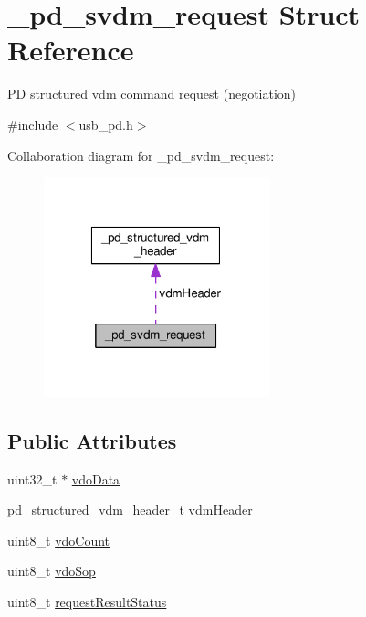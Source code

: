 \hypertarget{struct__pd__svdm__request}{\section{\-\_\-pd\-\_\-svdm\-\_\-request Struct Reference}
\label{struct__pd__svdm__request}
}


P\-D structured vdm command request (negotiation)  




{\ttfamily \#include $<$usb\-\_\-pd.\-h$>$}



Collaboration diagram for \-\_\-pd\-\_\-svdm\-\_\-request\-:
\nopagebreak
\begin{figure}[H]
\begin{center}
\leavevmode
\includegraphics[width=186pt]{struct__pd__svdm__request__coll__graph}
\end{center}
\end{figure}
\subsection*{Public Attributes}
\begin{DoxyCompactItemize}
\item 
uint32\-\_\-t $\ast$ \hyperlink{struct__pd__svdm__request_ac674930499f5462b363cb7890746888e}{vdo\-Data}
\item 
\hyperlink{group__usb__pd__stack_ga245b8bec3f3b7771e73016ac98595570}{pd\-\_\-structured\-\_\-vdm\-\_\-header\-\_\-t} \hyperlink{struct__pd__svdm__request_a502097a71d336575e7c64feded3fc3d1}{vdm\-Header}
\item 
uint8\-\_\-t \hyperlink{struct__pd__svdm__request_a447ad7fabf845dde656f32b7ba306582}{vdo\-Count}
\item 
uint8\-\_\-t \hyperlink{struct__pd__svdm__request_a7cc54e0d5070eeec62c3686c716cff28}{vdo\-Sop}
\item 
uint8\-\_\-t \hyperlink{struct__pd__svdm__request_a234e68f92801246ea761e56aa163c3e6}{request\-Result\-Status}
\end{DoxyCompactItemize}


